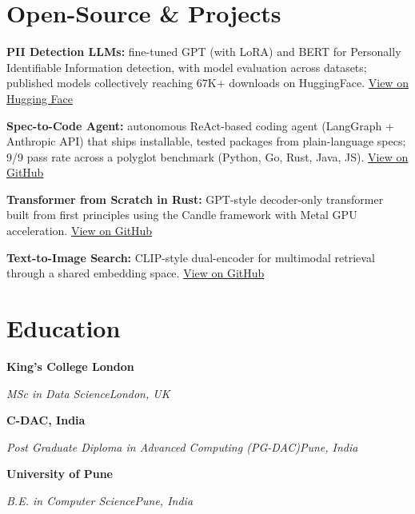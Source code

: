 \documentclass[10pt,a4paper]{article}
\newcommand{\entry}[4]{%
  {\color{company}\bfseries #1}\hfill {\color{muted}#2}\par
  \vspace{1pt}
  {\itshape #3}\hfill {\color{muted}\itshape #4}\par
  \vspace{3pt}%
}
\begin{document}
\section{Open-Source \& Projects}
\begin{tight}
  \item \textbf{PII Detection LLMs:} fine-tuned GPT (with LoRA) and BERT for Personally Identifiable Information detection, with model evaluation across datasets; published models collectively reaching 67K+ downloads on HuggingFace. \href{https://huggingface.co/ab-ai/pii_model}{View on Hugging Face}
  \item \textbf{Spec-to-Code Agent:} autonomous ReAct-based coding agent (LangGraph + Anthropic API) that ships installable, tested packages from plain-language specs; 9/9 pass rate across a polyglot benchmark (Python, Go, Rust, Java, JS). \href{https://github.com/abhijeetscode/Spec-to-Code-Agent}{View on GitHub}
  \item \textbf{Transformer from Scratch in Rust:} GPT-style decoder-only transformer built from first principles using the Candle framework with Metal GPU acceleration. \href{https://github.com/abhijeetscode/transformer-rust}{View on GitHub}
  \item \textbf{Text-to-Image Search:} CLIP-style dual-encoder for multimodal retrieval through a shared embedding space. \href{https://github.com/abhijeetscode/text-to-image-search}{View on GitHub}
\end{tight}

\section{Education}
\entry{King's College London}{}{MSc in Data Science}{London, UK}
\vspace{-3pt}
\entry{C-DAC, India}{}{Post Graduate Diploma in Advanced Computing (PG-DAC)}{Pune, India}
\vspace{-3pt}
\entry{University of Pune}{}{B.E. in Computer Science}{Pune, India}
\end{document}
